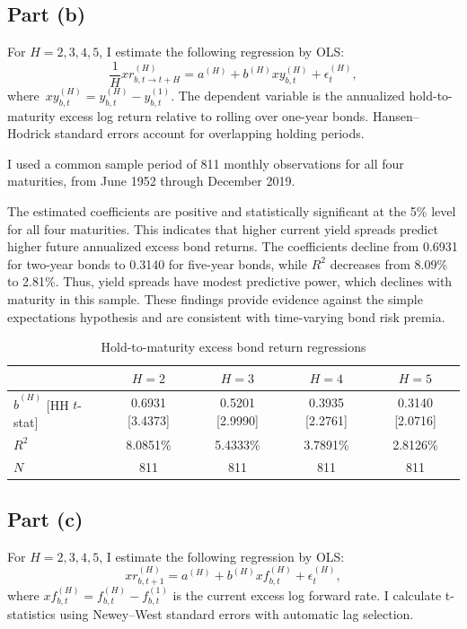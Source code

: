 \documentclass[11pt]{article}
\begin{document}
\subsection{Part (b)}
For $H=2,3,4,5$, I estimate the following regression by OLS:
\[ \frac{1}{H}xr_{b,t\to t+H}^{(H)} =a^{(H)}+b^{(H)}xy_{b,t}^{(H)}+\epsilon_t^{(H)}, \]
where \(xy_{b,t}^{(H)}=y_{b,t}^{(H)}-y_{b,t}^{(1)}\). The dependent variable is the annualized hold-to-maturity excess log return relative to rolling over one-year bonds. Hansen–Hodrick standard errors account for overlapping holding periods.

I used a common sample period of 811 monthly observations for all four maturities, from June 1952 through December 2019.

The estimated coefficients are positive and statistically significant at the 5\% level for all four maturities. This indicates that higher current yield spreads predict higher future annualized excess bond returns. 
The coefficients decline from 0.6931 for two-year bonds to 0.3140 for five-year bonds, while $R^{2}$ decreases from 8.09\% to 2.81\%. Thus, yield spreads have modest predictive power, which declines with maturity in this sample. 
These findings provide evidence against the simple expectations hypothesis and are consistent with time-varying bond risk premia.
\begin{table}[htbp]
    \centering
    \caption{Hold-to-maturity excess bond return regressions}
    \label{tab:q4b_bond_regressions}
    \begin{tabular}{lcccc}
        \toprule
        & $H=2$ & $H=3$ & $H=4$ & $H=5$ \\
        \midrule
        $\widehat{b}^{(H)}$ [HH $t$-stat] & 0.6931 [3.4373] & 0.5201 [2.9990] & 0.3935 [2.2761] & 0.3140 [2.0716] \\
        $R^2$ & 8.0851\% & 5.4333\% & 3.7891\% & 2.8126\% \\
        $N$ & 811 & 811 & 811 & 811 \\
        \bottomrule
    \end{tabular}
\end{table}

\clearpage
\subsection{Part (c)}
For \(H=2,3,4,5\), I estimate the following regression by OLS:
\[ xr_{b,t+1}^{(H)} =a^{(H)}+b^{(H)}xf_{b,t}^{(H)}+\epsilon_t^{(H)}, \]
where \(xf_{b,t}^{(H)}=f_{b,t}^{(H)}-f_{b,t}^{(1)}\) is the current excess log forward rate. I calculate t-statistics using Newey–West standard errors with automatic lag selection.
\end{document}
